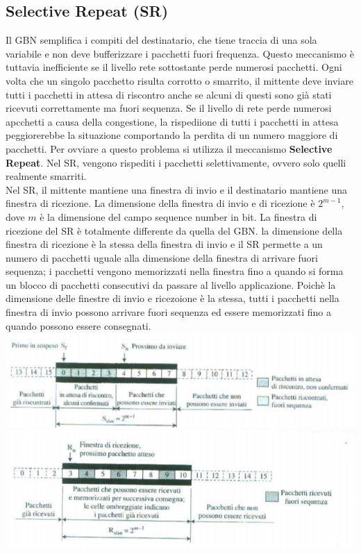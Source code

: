 \documentclass[12pt]{report}
\begin{document}
	\subsection{Selective Repeat (SR)}
	Il GBN semplifica i compiti del destinatario, che tiene traccia di una sola variabile e non deve bufferizzare i pacchetti fuori frequenza. Questo meccanismo è tuttavia inefficiente se il livello rete sottostante perde numerosi pacchetti. Ogni volta che un singolo pacchetto risulta corrotto o smarrito, il mittente deve inviare tutti i pacchetti in attesa di riscontro anche se alcuni di questi sono già stati ricevuti correttamente ma fuori sequenza. Se il livello di rete perde numerosi apcchetti a causa della congestione, la rispediione di tutti i pacchetti in attesa peggiorerebbe la situazione comportando la perdita di un numero maggiore di pacchetti. Per ovviare a questo problema si utilizza il meccanismo \textbf{Selective Repeat}. Nel SR, vengono rispediti i pacchetti selettivamente, ovvero solo quelli realmente smarriti.
	\vspace{\baselineskip}\\
	Nel SR, il mittente mantiene una finestra di invio e il destinatario mantiene una finestra di ricezione. La dimensione della finestra di invio e di ricezione è $2^{m-1}$, dove $m$ è la dimensione del campo sequence number in bit. La finestra di ricezione del SR è totalmente differente da quella del GBN. la dimensione della finestra di ricezione è la stessa della finestra di invio e il SR permette a un numero di pacchetti uguale alla dimensione della finestra di arrivare fuori sequenza; i pacchetti vengono memorizzati nella finestra fino a quando si forma un blocco di pacchetti consecutivi da passare al livello applicazione. Poichè la dimensione delle finestre di invio e ricezoione è la stessa, tutti i pacchetti nella finestra di invio possono arrivare fuori sequenza ed essere memorizzati fino a quando possono essere consegnati.
	\includegraphics[scale=0.6]{assets/sr.png}
	\includegraphics[scale=0.5]{assets/sr2.png}
\end{document}
